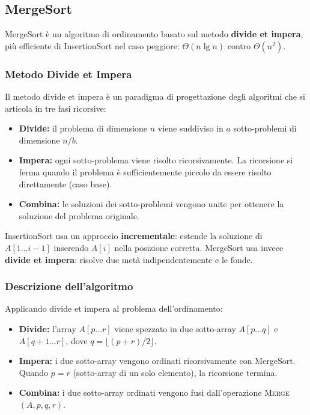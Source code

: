 \documentclass[a4paper, 11pt]{article}
\theoremstyle{definition}
\theoremstyle{remark}
\theoremstyle{remark}
\newenvironment{nota}{%
	\begin{tcolorbox}[
		colback=codebg,
		colframe=primary,
		fonttitle=\bfseries,
		title=Nota,
		left=6pt, right=6pt, top=4pt, bottom=4pt
		]
	}{%
	\end{tcolorbox}
}
\begin{document}
	\pagebreak
	
	\subsection{MergeSort}
	
	MergeSort è un algoritmo di ordinamento basato sul metodo \textbf{divide et impera},
	più efficiente di InsertionSort nel caso peggiore: $\Theta(n \lg n)$ contro $\Theta(n^2)$.
	
	\subsubsection{Metodo Divide et Impera}
	
	Il metodo divide et impera è un paradigma di progettazione degli algoritmi
	che si articola in tre fasi ricorsive:
	
	\begin{itemize}
		\item \textbf{Divide:} il problema di dimensione $n$ viene suddiviso
		in $a$ sotto-problemi di dimensione $n/b$.
		\item \textbf{Impera:} ogni sotto-problema viene risolto ricorsivamente.
		La ricorsione si ferma quando il problema è sufficientemente piccolo
		da essere risolto direttamente (caso base).
		\item \textbf{Combina:} le soluzioni dei sotto-problemi vengono
		unite per ottenere la soluzione del problema originale.
	\end{itemize}
	
	\begin{nota}
		InsertionSort usa un approccio \textbf{incrementale}: estende la
		soluzione di $A[1 \ldots i-1]$ inserendo $A[i]$ nella posizione corretta.
		MergeSort usa invece \textbf{divide et impera}: risolve due metà
		indipendentemente e le fonde.
	\end{nota}
	
	\subsubsection{Descrizione dell'algoritmo}
	
	Applicando divide et impera al problema dell'ordinamento:
	
	\begin{itemize}
		\item \textbf{Divide:} l'array $A[p \ldots r]$ viene spezzato in due
		sotto-array $A[p \ldots q]$ e $A[q+1 \ldots r]$, dove
		$q = \lfloor (p+r)/2 \rfloor$.
		\item \textbf{Impera:} i due sotto-array vengono ordinati ricorsivamente
		con MergeSort. Quando $p = r$ (sotto-array di un solo elemento),
		la ricorsione termina.
		\item \textbf{Combina:} i due sotto-array ordinati vengono fusi
		dall'operazione \textsc{Merge}$(A, p, q, r)$.
	\end{itemize}
	
\end{document}
